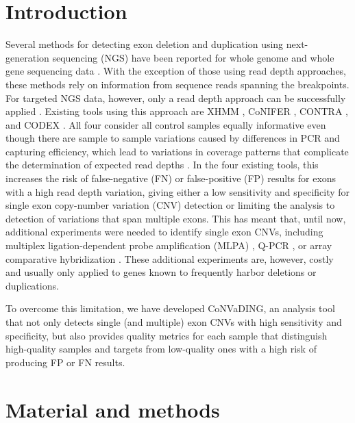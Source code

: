 \section{Introduction}\label{introduction}
Several methods for detecting exon deletion and duplication using next-generation sequencing (NGS) have been reported for whole genome \cite{Zhao_2013,Gilissen_2014,Francioli_2014} and whole gene sequencing data \cite{Wang_2014a}. 
With the exception of those using read depth approaches, these methods rely on information from sequence reads spanning the breakpoints. 
For targeted NGS data, however, only a read depth approach can be successfully applied \cite{Tan_2014}. 
Existing tools using this approach are XHMM \cite{Fromer_2012}, CoNIFER \cite{Krumm_2012}, CONTRA \cite{Li_2012}, and CODEX \cite{Jiang_2015}. 
All four consider all control samples equally informative even though there are sample to sample variations caused by differences in PCR and capturing efficiency, which lead to variations in coverage patterns that complicate the determination of expected read depths \cite{Aird_2011,Zhao_2013}. 
In the four existing tools, this increases the risk of false-negative (FN) or false-positive (FP) results for exons with a high read depth variation, giving either a low sensitivity and specificity for single exon copy-number variation (CNV) detection or limiting the analysis to detection of variations that span multiple exons. 
This has meant that, until now, additional experiments were needed to identify single exon CNVs, including multiplex ligation-dependent probe amplification (MLPA) \cite{Schouten_2002}, Q-PCR \cite{Ebenazer_2013}, or array comparative hybridization \cite{Vasson_2013}. 
These additional experiments are, however, costly and usually only applied to genes known to frequently harbor deletions or duplications. 

To overcome this limitation, we have developed CoNVaDING, an analysis tool that not only detects single (and multiple) exon CNVs with high sensitivity and specificity, but also provides quality metrics for each sample that distinguish high-quality samples and targets from low-quality ones with a high risk of producing FP or FN results.

\section{Material and methods}

